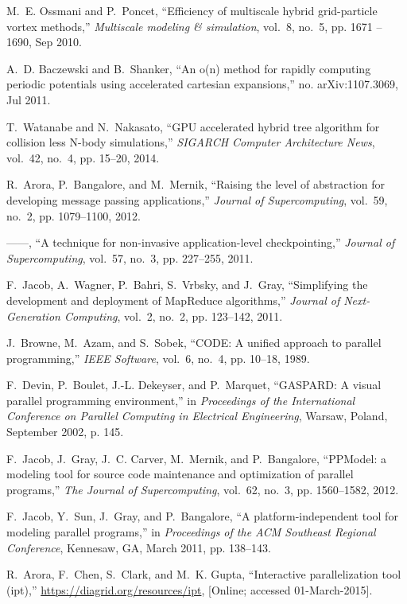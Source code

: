 \documentclass[draftclsnofoot]{elsarticle}
\begin{document}
\begin{thebibliography}{10}
M.~E. Ossmani and P.~Poncet, ``Efficiency of multiscale hybrid grid-particle
  vortex methods,'' \emph{Multiscale modeling \& simulation}, vol.~8, no.~5,
  pp. 1671 -- 1690, Sep 2010.

A.~D. Baczewski and B.~Shanker, ``An o(n) method for rapidly computing periodic
  potentials using accelerated cartesian expansions,'' no. arXiv:1107.3069, Jul
  2011.

T.~Watanabe and N.~Nakasato, ``{GPU} accelerated hybrid tree algorithm for
  collision less {N}-body simulations,'' \emph{SIGARCH Computer Architecture
  News}, vol.~42, no.~4, pp. 15--20, 2014.

R.~Arora, P.~Bangalore, and M.~Mernik, ``Raising the level of abstraction for
  developing message passing applications,'' \emph{Journal of Supercomputing},
  vol.~59, no.~2, pp. 1079--1100, 2012.

------, ``A technique for non-invasive application-level checkpointing,''
  \emph{Journal of Supercomputing}, vol.~57, no.~3, pp. 227--255, 2011.

F.~Jacob, A.~Wagner, P.~Bahri, S.~Vrbsky, and J.~Gray, ``Simplifying the
  development and deployment of {M}ap{R}educe algorithms,'' \emph{Journal of
  Next-Generation Computing}, vol.~2, no.~2, pp. 123--142, 2011.

J.~Browne, M.~Azam, and S.~Sobek, ``{CODE}: {A} unified approach to parallel
  programming,'' \emph{IEEE Software}, vol.~6, no.~4, pp. 10--18, 1989.

F.~Devin, P.~Boulet, J.-L. Dekeyser, and P.~Marquet, ``{GASPARD}: {A} visual
  parallel programming environment,'' in \emph{Proceedings of the International
  Conference on Parallel Computing in Electrical Engineering}, Warsaw, Poland,
  September 2002, p. 145.

F.~Jacob, J.~Gray, J.~C. Carver, M.~Mernik, and P.~Bangalore, ``{PPModel}: a
  modeling tool for source code maintenance and optimization of parallel
  programs,'' \emph{The Journal of Supercomputing}, vol.~62, no.~3, pp.
  1560--1582, 2012.

F.~Jacob, Y.~Sun, J.~Gray, and P.~Bangalore, ``A platform-independent tool for
  modeling parallel programs,'' in \emph{Proceedings of the ACM Southeast
  Regional Conference}, Kennesaw, GA, March 2011, pp. 138--143.

R.~Arora, F.~Chen, S.~Clark, and M.~K. Gupta, ``Interactive parallelization
  tool (ipt),'' \url{https://diagrid.org/resources/ipt}, [Online; accessed
  01-March-2015].

\end{thebibliography}
\end{document}
